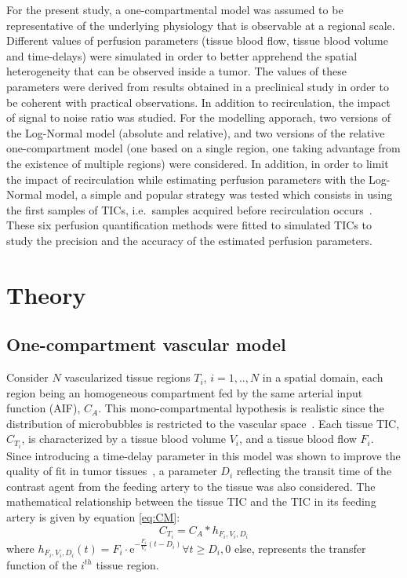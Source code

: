 For the present study, a one-compartmental model was assumed to be representative of the underlying physiology that is observable at a regional scale. Different values of perfusion parameters (tissue blood flow, tissue blood volume and time-delays) were simulated in order to better apprehend the spatial heterogeneity that can be observed inside a tumor. The values of these parameters were derived from results obtained in a preclinical study in order to be coherent with practical observations. In addition to recirculation, the impact of signal to noise ratio was  studied. For the modelling apporach, two versions of the Log-Normal model (absolute and relative), and two versions of the relative one-compartment model (one based on a single region, one taking advantage from the existence of multiple regions) were considered. In addition, in order to limit the impact of recirculation while estimating perfusion parameters with the Log-Normal model, a simple and popular strategy was tested which consists in using the first samples of TICs, i.e.~samples acquired before recirculation occurs~\cite{Lowerison2017}. These six perfusion quantification methods were fitted to simulated TICs to study the precision and  the accuracy of the estimated perfusion parameters. 

\section{Theory}

\subsection{One-compartment vascular model}
\label{sec:simmdl}
Consider $N$ vascularized tissue regions $T_i$, $i=1,..,N$ in a spatial domain, each region being an homogeneous compartment fed by the same arterial input function (AIF), $C_A$. This mono-compartmental hypothesis is realistic since the distribution of microbubbles is restricted to the vascular space~\cite{Gunn:2001cx}. Each tissue TIC, $C_{T_i}$, is characterized by a tissue blood volume $V_i$, and a tissue blood flow $F_i$. Since introducing a time-delay parameter in this model was shown to improve the quality of fit in tumor tissues~\cite{Doury:2017fz}, a parameter $D_i$ reflecting the transit time of the contrast agent from the feeding artery to the tissue was also considered. 
The mathematical relationship between the tissue TIC and the TIC in its feeding artery is given by equation \ref{eq:CM}:
\begin{equation}
 C_{T_i} = C_A \ast h_{F_i,V_i,D_i}
\label{eq:CM}
\end{equation}
where $h_{F_i,V_i,D_i} (t) = F_i \cdot \mathrm{e}^{-\frac{F_i}{V_i} \left( t - D_i \right)}\forall t \geq D_i, 0$ else, represents the transfer function of the $i^{th}$ tissue region.

